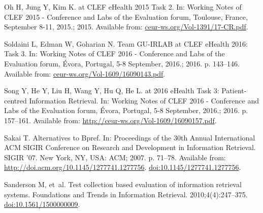 \documentclass[10pt,a4paper]{article}
\begin{document}
\begin{thebibliography}{10}
	Oh H, Jung Y, Kim K.
	 at {CLEF} eHealth 2015 Task 2.
	\newblock In: Working Notes of {CLEF} 2015 - Conference and Labs of the
	Evaluation forum, Toulouse, France, September 8-11, 2015.; 2015. Available
	from: \url{ceur-ws.org/Vol-1391/17-CR.pdf}.
	
	Soldaini L, Edman W, Goharian N.
	\newblock Team {GU-IRLAB} at {CLEF} eHealth 2016: Task 3.
	\newblock In: Working Notes of {CLEF} 2016 - Conference and Labs of the
	Evaluation forum, {\'{E}}vora, Portugal, 5-8 September, 2016.; 2016. p.
	143--146.
	\newblock Available from: \url{ceur-ws.org/Vol-1609/16090143.pdf}.
	
	Song Y, He Y, Liu H, Wang Y, Hu Q, He L.
	 at 2016 eHealth Task 3: Patient-centred Information Retrieval.
	\newblock In: Working Notes of {CLEF} 2016 - Conference and Labs of the
	Evaluation forum, {\'{E}}vora, Portugal, 5-8 September, 2016.; 2016. p.
	157--161.
	\newblock Available from: \url{http://ceur-ws.org/Vol-1609/16090157.pdf}.
	
	Sakai T.
	\newblock Alternatives to Bpref.
	\newblock In: Proceedings of the 30th Annual International ACM SIGIR Conference
	on Research and Development in Information Retrieval. SIGIR '07. New York,
	NY, USA: ACM; 2007. p. 71--78.
	\newblock Available from: \url{http://doi.acm.org/10.1145/1277741.1277756}.
	\href {http://dx.doi.org/10.1145/1277741.1277756}
	{doi:10.1145/1277741.1277756}.

	Sanderson M, et~al.
	\newblock Test collection based evaluation of information retrieval systems.
	\newblock Foundations and Trends{\textregistered} in Information Retrieval.
	2010;4(4):247--375.
	\newblock \href {http://dx.doi.org/10.1561/1500000009}
	{doi:10.1561/1500000009}.
	
\end{thebibliography}
\end{document}
